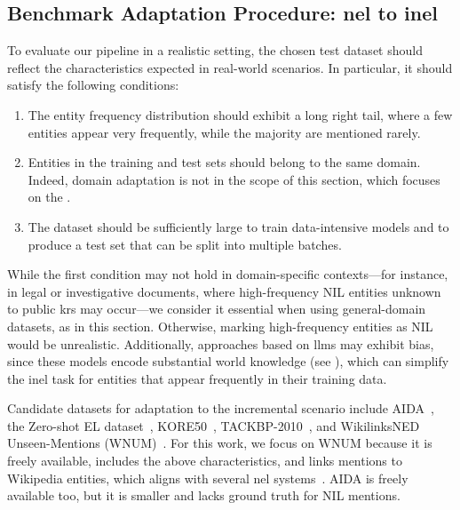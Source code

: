 \subsection{Benchmark Adaptation Procedure: \ac{nel} to \ac{inel}}
\label{sec:ijckg:dataset}
To evaluate our pipeline in a realistic setting, the chosen test dataset should reflect the characteristics expected in real-world scenarios. In particular, it should satisfy the following conditions:

\begin{enumerate}
\item The entity frequency distribution should exhibit a long right tail, where a few entities appear very frequently, while the majority are mentioned rarely.
\item Entities in the training and test sets should belong to the same domain. Indeed, domain adaptation is not in the scope of this section, which focuses on the \nilchallenge.
\item The dataset should be sufficiently large to train data-intensive models and to produce a test set that can be split into multiple batches.
\end{enumerate}

While the first condition may not hold in domain-specific contexts---for instance, in legal or investigative documents, where high-frequency NIL entities unknown to public \acp{kr} may occur---we consider it essential when using general-domain datasets, as in this section. Otherwise, marking high-frequency entities as NIL would be unrealistic. Additionally, approaches based on \acp{llm} may exhibit bias, since these models encode substantial world knowledge (see ), which can simplify the \ac{inel} task for entities that appear frequently in their training data.

Candidate datasets for adaptation to the incremental scenario include AIDA~\cite{aida}, the Zero-shot EL dataset~\cite{logeswaran-etal-2019-zero}, KORE50~\cite{kore50}, TACKBP-2010~\cite{ji2010overview}, and WikilinksNED Unseen-Mentions (WNUM)~\cite{Onoe_Durrett_2020}. For this work, we focus on WNUM because it is freely available, includes the above characteristics, and links mentions to Wikipedia entities, which aligns with several \ac{nel} systems~\cite{blink,decao2021autoregressive,barba-etal-2022-extend}. AIDA is freely available too, but it is smaller and lacks ground truth for NIL mentions.

